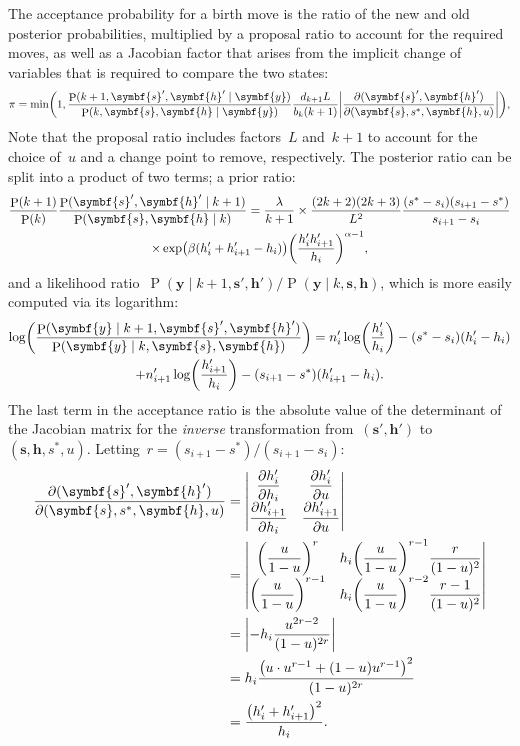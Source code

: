 \documentclass[11pt,a4paper]{article}
\newcommand\ub[1]{\symbf{#1}}                    %
\DeclareMathOperator\Pb{P}                       %
\DeclarePairedDelimiter\lr{\lparen}{\rparen}     %
\DeclarePairedDelimiter\abs{\lvert}{\rvert}      %
\theoremstyle{definition}
\begin{document}
The acceptance probability for a birth move is the ratio of the new and old
posterior probabilities, multiplied by a proposal ratio to account for the
required moves, as well as a Jacobian factor that arises from the implicit
change of variables that is required to compare the two states:
\[ \pi = \min\lr*{1, \frac{\Pb(k+1,\ub{s}',\ub{h}' \mid \ub{y})}
    {\Pb(k,\ub{s},\ub{h} \mid \ub{y})} \frac{d_{k+1}L}{b_k(k+1)}
    \abs*{\frac{\partial(\ub{s}',\ub{h}')}{\partial(\ub{s},s^*,\ub{h},u)}}}, \]
Note that the proposal ratio includes factors~$L$ and~$k+1$ to account for the
choice of~$u$ and a change point to remove, respectively. The posterior ratio
can be split into a product of two terms; a prior ratio:
\begin{multline*}
  \frac{\Pb(k+1)}{\Pb(k)}
      \frac{\Pb(\ub{s}',\ub{h}' \mid k+1)}{\Pb(\ub{s},\ub{h} \mid k)}
    = \frac{\lambda}{k+1} \times \frac{(2k+2)(2k+3)}{L^2}
      \frac{(s^* - s_i)(s_{i+1} - s^*)}{s_{i+1} - s_i} \\
    \times \exp\lr*{\beta(h_i'+h_{i+1}'-h_i)}
      \lr*{\frac{h_i'h_{i+1}'}{h_i}}^{\alpha-1},
\end{multline*}
and a likelihood ratio~$\Pb(\ub{y} \mid k+1,\ub{s}',\ub{h}')/
\Pb(\ub{y} \mid k,\ub{s},\ub{h})$, which is more easily computed via its
logarithm:
\begin{multline*}
  \log\lr*{\frac{\Pb(\ub{y} \mid k+1,\ub{s}',\ub{h}')}
        {\Pb(\ub{y} \mid k,\ub{s},\ub{h})}}
    = n_i'\log\lr*{\frac{h_i'}{h_i}} - (s^*-s_i)(h_i'-h_i) \\
      + n_{i+1}'\log\lr*{\frac{h_{i+1}'}{h_i}} - (s_{i+1}-s^*)(h_{i+1}'-h_i).
\end{multline*}
The last term in the acceptance ratio is the absolute value of the determinant
of the Jacobian matrix for the \emph{inverse} transformation
from~$(\ub{s}',\ub{h}')$ to~$(\ub{s},\ub{h},s^*,u)$. Letting~$r =
(s_{i+1}-s^*)/(s_{i+1}-s_i)$:
\begin{align*}
  \frac{\partial(\ub{s}',\ub{h}')}{\partial(\ub{s},s^*,\ub{h},u)}
    &= \begin{vmatrix}
        \dfrac{\partial h_i'}{\partial h_i}
          & \dfrac{\partial h_i'}{\partial u} \\
        \dfrac{\partial h_{i+1}'}{\partial h_i}
          & \dfrac{\partial h_{i+1}'}{\partial u}
      \end{vmatrix} \\
    &= \begin{vmatrix}
        \lr*{\dfrac{u}{1-u}}^r
          & h_i \lr*{\dfrac{u}{1-u}}^{r-1}\dfrac{r}{(1-u)^2} \\
        \lr*{\dfrac{u}{1-u}}^{r-1}
          & h_i \lr*{\dfrac{u}{1-u}}^{r-2}\dfrac{r-1}{(1-u)^2}
      \end{vmatrix} \\
    &= \abs*{-h_i \frac{u^{2r-2}}{(1-u)^{2r}}} \\
    &= h_i \frac{\lr*{u \cdot u^{r-1} + (1-u)u^{r-1}}^2}{(1-u)^{2r}} \\
    &= \frac{\lr*{h_i' + h_{i+1}'}^2}{h_i}.
\end{align*}
\end{document}
